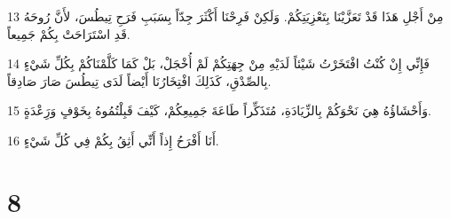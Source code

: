 \par 13 مِنْ أَجْلِ هَذَا قَدْ تَعَزَّيْنَا بِتَعْزِيَتِكُمْ. وَلَكِنْ فَرِحْنَا أَكْثَرَ جِدّاً بِسَبَبِ فَرَحِ تِيطُسَ، لأَنَّ رُوحَهُ قَدِ اسْتَرَاحَتْ بِكُمْ جَمِيعاً.
\par 14 فَإِنِّي إِنْ كُنْتُ افْتَخَرْتُ شَيْئاً لَدَيْهِ مِنْ جِهَتِكُمْ لَمْ أُخْجَلْ، بَلْ كَمَا كَلَّمْنَاكُمْ بِكُلِّ شَيْءٍ بِالصِّدْقِ، كَذَلِكَ افْتِخَارُنَا أَيْضاً لَدَى تِيطُسَ صَارَ صَادِقاً.
\par 15 وَأَحْشَاؤُهُ هِيَ نَحْوَكُمْ بِالزِّيَادَةِ، مُتَذَكِّراً طَاعَةَ جَمِيعِكُمْ، كَيْفَ قَبِلْتُمُوهُ بِخَوْفٍ وَرَِعْدَةٍ.
\par 16 أَنَا أَفْرَحُ إِذاً أَنِّي أَثِقُ بِكُمْ فِي كُلِّ شَيْءٍ.

\chapter{8}

